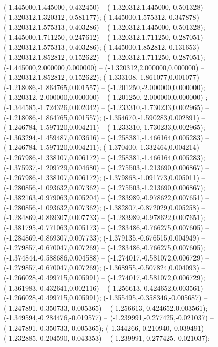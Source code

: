  (-1.445000,1.445000,-0.432450) -- (-1.320312,1.445000,-0.501328) -- (-1.320312,1.320312,-0.581177);
 (-1.445000,1.575312,-0.347878) -- (-1.320312,1.575313,-0.403286) -- (-1.320312,1.445000,-0.501328);
 (-1.445000,1.711250,-0.247612) -- (-1.320312,1.711250,-0.287051) -- (-1.320312,1.575313,-0.403286);
 (-1.445000,1.852812,-0.131653) -- (-1.320312,1.852812,-0.152622) -- (-1.320312,1.711250,-0.287051);
 (-1.445000,2.000000,0.000000) -- (-1.320312,2.000000,0.000000) -- (-1.320312,1.852812,-0.152622);
 (-1.333108,-1.861077,0.001077) -- (-1.218086,-1.864765,0.001557) -- (-1.201250,-2.000000,0.000000);
 (-1.320312,-2.000000,0.000000) -- (-1.201250,-2.000000,0.000000) ;
 (-1.344585,-1.724326,0.002042) -- (-1.233310,-1.730233,0.002965) -- (-1.218086,-1.864765,0.001557);
 (-1.354670,-1.590283,0.002891) -- (-1.246784,-1.597120,0.004211) -- (-1.233310,-1.730233,0.002965);
 (-1.363294,-1.459487,0.003616) -- (-1.258381,-1.466164,0.005283) -- (-1.246784,-1.597120,0.004211);
 (-1.370400,-1.332464,0.004214) -- (-1.267986,-1.338107,0.006172) -- (-1.258381,-1.466164,0.005283);
 (-1.375937,-1.209729,0.004680) -- (-1.275503,-1.213690,0.006867) -- (-1.267986,-1.338107,0.006172);
 (-1.379868,-1.091773,0.005011) -- (-1.280856,-1.093632,0.007362) -- (-1.275503,-1.213690,0.006867);
 (-1.382163,-0.979063,0.005204) -- (-1.283989,-0.978622,0.007651) -- (-1.280856,-1.093632,0.007362);
 (-1.382807,-0.872029,0.005258) -- (-1.284869,-0.869307,0.007733) -- (-1.283989,-0.978622,0.007651);
 (-1.381795,-0.771063,0.005173) -- (-1.283486,-0.766275,0.007605) -- (-1.284869,-0.869307,0.007733);
 (-1.379135,-0.676515,0.004949) -- (-1.279857,-0.670047,0.007269) -- (-1.283486,-0.766275,0.007605);
 (-1.374844,-0.588686,0.004588) -- (-1.274017,-0.581072,0.006729) -- (-1.279857,-0.670047,0.007269);
 (-1.368955,-0.507824,0.004093) -- (-1.266028,-0.499715,0.005991) -- (-1.274017,-0.581072,0.006729);
 (-1.361983,-0.432641,0.002116) -- (-1.256613,-0.424652,0.003561) -- (-1.266028,-0.499715,0.005991);
 (-1.355495,-0.358346,-0.005687) -- (-1.247891,-0.350733,-0.005365) -- (-1.256613,-0.424652,0.003561);
 (-1.349594,-0.284476,-0.019577) -- (-1.239991,-0.277425,-0.021037) -- (-1.247891,-0.350733,-0.005365);
 (-1.344266,-0.210940,-0.039491) -- (-1.232885,-0.204590,-0.043353) -- (-1.239991,-0.277425,-0.021037);
